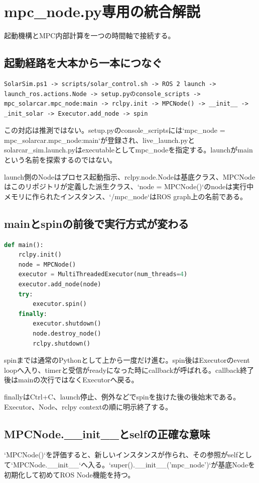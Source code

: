 \documentclass[a4paper,11pt]{article}
\begin{document}
        \section{mpc\_node.py専用の統合解説}
起動機構とMPC内部計算を一つの時間軸で接続する。

\subsection{起動経路を大本から一本につなぐ}
\begin{lstlisting}
SolarSim.ps1 -> scripts/solar_control.sh -> ROS 2 launch -> launch_ros.actions.Node -> setup.pyのconsole_scripts -> mpc_solarcar.mpc_node:main -> rclpy.init -> MPCNode() -> __init__ -> _init_solar -> Executor.add_node -> spin
\end{lstlisting}


この対応は推測ではない。setup.pyのconsole\_scriptsには`mpc\_node = mpc\_solarcar.mpc\_node:main`が登録され、live\_launch.pyとsolarcar\_sim.launch.pyはexecutableとしてmpc\_nodeを指定する。launchがmainという名前を探索するのではない。


launch側のNodeはプロセス起動指示、rclpy.node.Nodeは基底クラス、MPCNodeはこのリポジトリが定義した派生クラス、`node = MPCNode()`のnodeは実行中メモリに作られたインスタンス、`/mpc\_node`はROS graph上の名前である。



\subsection{mainとspinの前後で実行方式が変わる}
\begin{lstlisting}[language=python]
def main():
    rclpy.init()
    node = MPCNode()
    executor = MultiThreadedExecutor(num_threads=4)
    executor.add_node(node)
    try:
        executor.spin()
    finally:
        executor.shutdown()
        node.destroy_node()
        rclpy.shutdown()
\end{lstlisting}


spinまでは通常のPythonとして上から一度だけ進む。spin後はExecutorのevent loopへ入り、timerと受信がreadyになった時にcallbackが呼ばれる。callback終了後はmainの次行ではなくExecutorへ戻る。


finallyはCtrl+C、launch停止、例外などでspinを抜けた後の後始末である。Executor、Node、rclpy contextの順に明示終了する。



\subsection{MPCNode.\_\_init\_\_とselfの正確な意味}
`MPCNode()`を評価すると、新しいインスタンスが作られ、その参照がselfとして`MPCNode.\_\_init\_\_`へ入る。`super().\_\_init\_\_('mpc\_node')`が基底Nodeを初期化して初めてROS Node機能を持つ。
\end{document}
